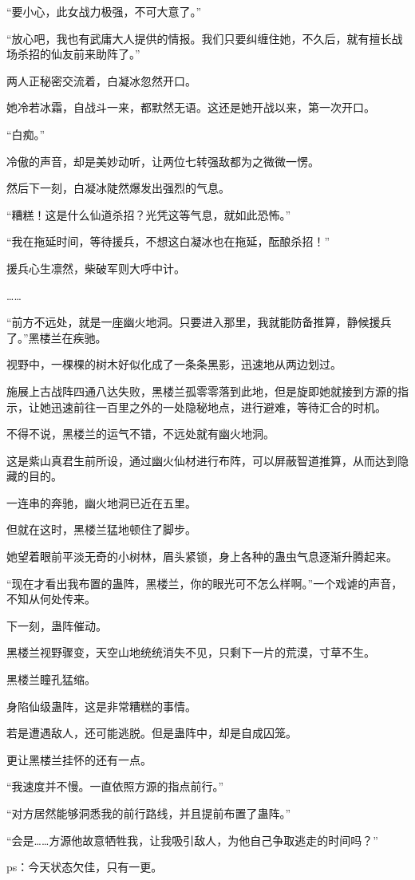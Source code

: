\begin{this_body}
“要小心，此女战力极强，不可大意了。”

“放心吧，我也有武庸大人提供的情报。我们只要纠缠住她，不久后，就有擅长战场杀招的仙友前来助阵了。”

两人正秘密交流着，白凝冰忽然开口。

她冷若冰霜，自战斗一来，都默然无语。这还是她开战以来，第一次开口。

“白痴。”

冷傲的声音，却是美妙动听，让两位七转强敌都为之微微一愣。

然后下一刻，白凝冰陡然爆发出强烈的气息。

“糟糕！这是什么仙道杀招？光凭这等气息，就如此恐怖。”

“我在拖延时间，等待援兵，不想这白凝冰也在拖延，酝酿杀招！”

援兵心生凛然，柴破军则大呼中计。

……

“前方不远处，就是一座幽火地洞。只要进入那里，我就能防备推算，静候援兵了。”黑楼兰在疾驰。

视野中，一棵棵的树木好似化成了一条条黑影，迅速地从两边划过。

施展上古战阵四通八达失败，黑楼兰孤零零落到此地，但是旋即她就接到方源的指示，让她迅速前往一百里之外的一处隐秘地点，进行避难，等待汇合的时机。

不得不说，黑楼兰的运气不错，不远处就有幽火地洞。

这是紫山真君生前所设，通过幽火仙材进行布阵，可以屏蔽智道推算，从而达到隐藏的目的。

一连串的奔驰，幽火地洞已近在五里。

但就在这时，黑楼兰猛地顿住了脚步。

她望着眼前平淡无奇的小树林，眉头紧锁，身上各种的蛊虫气息逐渐升腾起来。

“现在才看出我布置的蛊阵，黑楼兰，你的眼光可不怎么样啊。”一个戏谑的声音，不知从何处传来。

下一刻，蛊阵催动。

黑楼兰视野骤变，天空山地统统消失不见，只剩下一片的荒漠，寸草不生。

黑楼兰瞳孔猛缩。

身陷仙级蛊阵，这是非常糟糕的事情。

若是遭遇敌人，还可能逃脱。但是蛊阵中，却是自成囚笼。

更让黑楼兰挂怀的还有一点。

“我速度并不慢。一直依照方源的指点前行。”

“对方居然能够洞悉我的前行路线，并且提前布置了蛊阵。”

“会是……方源他故意牺牲我，让我吸引敌人，为他自己争取逃走的时间吗？”

ps：今天状态欠佳，只有一更。

\end{this_body}

